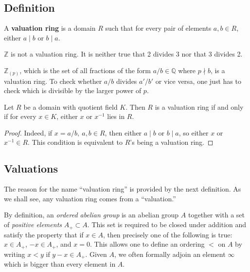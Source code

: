 \subsection{Definition}

\begin{definition}
A \textbf{valuation ring} is a domain $R$ such that for every pair of elements
$a,b \in R$, either $a \mid b$ or $b \mid a$.
\end{definition}

\begin{example}
$\mathbb{Z}$ is not a valuation ring. It is neither true that  2 divides 3
nor that 3 divides 2.
\end{example}

\begin{example}
$\mathbb{Z}_{(p)}$, which is the set of all fractions of the form $a/b \in
\mathbb{Q}$ where $p \nmid b$, is a valuation ring. To check whether $a/b$
divides $a'/b'$ or vice versa, one  just has to check which is divisible by
the larger power of $p$.
\end{example}

\begin{proposition}
Let $R$ be a domain with quotient field $K$. Then $R$ is a valuation ring if
and only if for every $x \in K$, either $x$ or $x^{-1}$ lies in $R$.
\end{proposition}

\begin{proof} Indeed, if $x=a/b , \ a,b \in R$, then either $a \mid
b$ or $b \mid a$, so either $x$ or $x^{-1} \in R$. This condition is equivalent
to $R$'s being a valuation ring.
\end{proof}


\subsection{Valuations}
The reason for the name ``valuation ring'' is provided by the next definition.
As we shall see, any valuation ring comes from a ``valuation.''

By definition, an \emph{ordered abelian group} is an abelian group $A$
together with a set of \emph{positive elements} $A_+ \subset A$. This set is
required to be closed under addition and satisfy the property that if $x \in
A$, then precisely one of the following is true: $x \in A_+$, $-x \in A_+$,
and $x = 0$. This allows one to define an ordering $<$ on $A$ by writing $x<y$
if $y-x \in A_+$.
Given $A$, we often formally adjoin an element $\infty$ which is bigger than
every element in $A$.


